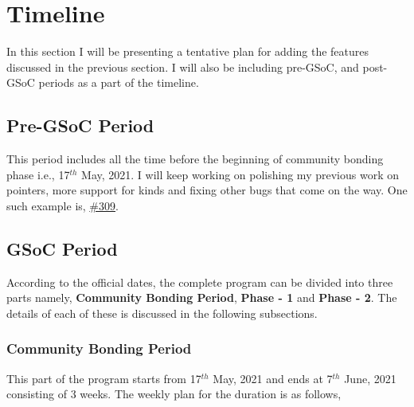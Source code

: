\section{Timeline}

In this section I will be presenting a tentative plan for adding the features discussed in the previous section. I will also be including pre-GSoC, and post-GSoC periods as a part of the timeline.

\subsection{Pre-GSoC Period}

This period includes all the time before the beginning of community bonding phase i.e., 17$^{th}$ May, 2021. I will keep working on polishing my previous work on pointers, more support for kinds and fixing other bugs that come on the way. One such example is, \href{https://gitlab.com/lfortran/lfortran/-/issues/309}{\#309}.

\subsection{GSoC Period}

According to the official dates, the complete program can be divided into three parts namely, \textbf{Community Bonding Period}, \textbf{Phase - 1} and \textbf{Phase - 2}. The details of each of these is discussed in the following subsections.

\subsubsection{Community Bonding Period}

This part of the program starts from 17$^{th}$ May, 2021 and ends at 7$^{th}$ June, 2021 consisting of 3 weeks. The weekly plan for the duration is as follows,

